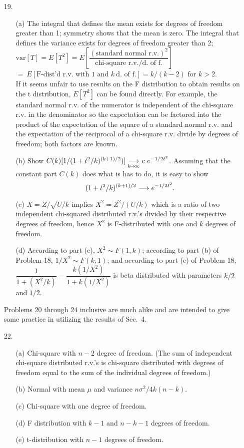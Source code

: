\begin{enumerate}
	\newpage

	\item[19.]  \begin{enumerate}
		\item[(a)] The integral that defines the mean exists for degrees of freedom greater than 1; symmetry shows that the mean is zero. The integral that defines the variance exists for degrees of freedom greater than 2; \\
		$\mbox{var}[T] = E[T^2] = E[\dfrac{(\mbox{standard normal r.v.})^2}{\mbox{chi-square r.v./d.\ of f.}}]$ \\
		$=\ E[\mbox{F-dist'd r.v.\ with 1 and }k\ \mbox{d.\ of f.}] = k/(k-2)$ for $k>2$.	\\
		If it seems unfair to use results on the F distribution to obtain results on the t distribution, $E[T^2]$ can be found directly. For example, the standard normal r.v. of the numerator is independent of the chi-square r.v. in the denominator so the expectation can be factored into the product of the expectation of the square of a standard normal r.v. and the expectation of the reciprocal of a chi-square r.v. divide by degrees of freedom; both factors are known.
		\item[(b)] Show $C(k)[1/(1+t^2/k)^{(k+1)/2})] \underset {\tiny {k\! \to\! \infty}}{ \longrightarrow} c\ e^{-{\small 1/2}t^2}$.
		Assuming that the constant part $C(k)$ does what is has to do, it is easy to show 
		\[(1 + t^2/k)^{(k+1)/2} \longrightarrow e^{-{\small 1/2}t^2}. \]
		\item[(c)] $X = Z/\sqrt{U/k}$ implies $X^2 = Z^2/(U/k)$ which is a ratio of two independent chi-squared distributed r.v.'s divided by their respective degrees of freedom, hence $X^2$ is F-distributed with one and $k$ degrees of freedom.
		\item[(d)] According to part (c), $X^2\sim F(1,k)$; according to part (b) of Problem 18, $1/X^2\sim F(k,1)$; and according to part (c) of Problem 18, $\dfrac{1}{1+(X^2/k)} = \dfrac{k(1/X^2)}{1+k(1/X^2)}$ is beta distributed with parameters $k/2$ and $1/2$.
	\end{enumerate}

Problems 20 through 24 inclusive are much alike and are intended to give some practice in utilizing the results of Sec.\ 4.

	\item[22.] \begin{enumerate}
		\item[(a)] Chi-square with $n-2$ degree of freedom. (The sum of independent chi-square distributed r.v.'s is chi-square distributed with degrees of freedom equal to the sum of the individual degrees of freedom.)	
		\item[(b)] Normal with mean $\mu$ and variance $n\sigma^2/4k(n-k)$.
		\item[(c)] Chi-square with one degree of freedom.
		\item[(d)] F distribution with $k-1$ and $n-k-1$ degrees of freedom.
		\item[(e)] t-distribution with $n-1$ degrees of freedom.
	\end{enumerate}


\end{enumerate}
